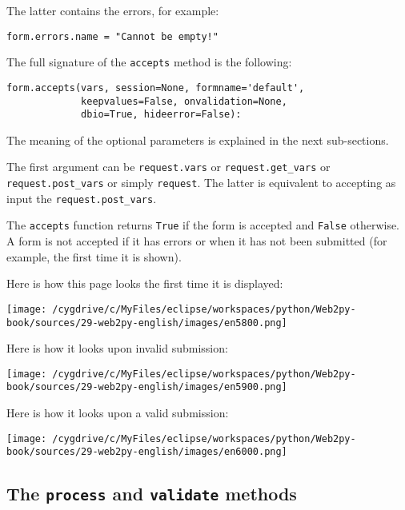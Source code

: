 \documentclass[justified,sixbynine,notoc]{tufte-book}
\def\ft{\small\tt}
\def\inxx#1{\index{#1}}
\begin{document}
\begin{fullwidth}
The latter contains the errors, for example:
\begin{lstlisting}
form.errors.name = "Cannot be empty!"
\end{lstlisting}

The full signature of the {\ft accepts} method is the following:
\inxx{onvalidation}
\begin{lstlisting}
form.accepts(vars, session=None, formname='default',
             keepvalues=False, onvalidation=None,
             dbio=True, hideerror=False):
\end{lstlisting}

The meaning of the optional parameters is explained in the next sub-sections.

The first argument can be {\ft request.vars} or {\ft request.get\_vars} or {\ft request.post\_vars} or simply {\ft request}. The latter is equivalent to accepting as input the {\ft request.post\_vars}.

The {\ft accepts}  function returns {\ft True} if the form is accepted and {\ft False} otherwise. A form is not accepted if it has errors or when it has not been submitted (for example, the first time it is shown).

Here is how this page looks the first time it is displayed:


\goodbreak\begin{center}\texttt{[image: /cygdrive/c/MyFiles/eclipse/workspaces/python/Web2py-book/sources/29-web2py-english/images/en5800.png]}\end{center}


Here is how it looks upon invalid submission:


\goodbreak\begin{center}\texttt{[image: /cygdrive/c/MyFiles/eclipse/workspaces/python/Web2py-book/sources/29-web2py-english/images/en5900.png]}\end{center}


Here is how it looks upon a valid submission:


\goodbreak\begin{center}\texttt{[image: /cygdrive/c/MyFiles/eclipse/workspaces/python/Web2py-book/sources/29-web2py-english/images/en6000.png]}\end{center}


\goodbreak\subsection{The {\ft process} and {\ft validate} methods}


\end{fullwidth}
\end{document}
